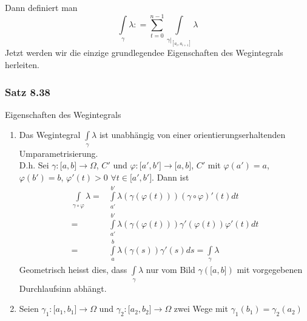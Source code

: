 \begin{enumerate}
Dann definiert man
\[\int\limits_\gamma  \lambda  : = \sum\limits_{t = 0}^{n - 1} {\int\limits_{{{\left. \gamma  \right|}_{\left[ {{a_i},{a_{i + 1}}} \right]}}} \lambda  } \]
Jetzt werden wir die einzige grundlegendee Eigenschaften des Wegintegrals herleiten.
\end{enumerate}

\subsubsection*{Satz 8.38}
Eigenschaften des Wegintegrals 
\begin{enumerate}[\indent E1)]
\item Das Wegintegral $\int\limits_\gamma  \lambda  $ ist unabhängig von einer orientierungserhaltenden Umparametrisierung. \\
D.h. Sei $\gamma :\lbrack a,b\rbrack\to\Omega$, $C'$ und $\varphi :\lbrack a',b'\rbrack\to\lbrack a,b\rbrack$, $C'$ mit $\varphi\left( a'\right)=a$, $\varphi\left( b'\right)=b$, $\varphi'\left( t\right) >0$ $\forall t\in\lbrack a', b'\rbrack$. Dann ist
\begin{align*}
\int\limits_{\gamma  \circ \varphi } \lambda   = &\int\limits_{a'}^{b'} {\lambda \left( {\gamma \left( {\varphi (t)} \right)} \right)\left( {\gamma  \circ \varphi } \right)'(t)dt} \\
 = &\int\limits_{a'}^{b'} {\lambda \left( {\gamma \left( {\varphi (t)} \right)} \right)\gamma '\left( {\varphi (t)} \right)\varphi '(t)dt} \\
 = &\int\limits_a^b {\lambda \left( {\gamma \left( s \right)} \right)\gamma '\left( s \right)ds = \int\limits_\gamma  \lambda  }
\end{align*}
Geometrisch heisst dies, dass $\int\limits_\gamma  \lambda$ nur vom Bild $\gamma\left( \lbrack a,b\rbrack\right)$ mit vorgegebenen Durchlaufsinn abhängt.
\item Seien $\gamma_1:\lbrack a_1,b_1\rbrack\to\Omega$ und $\gamma_2:\lbrack a_2,b_2\rbrack\to\Omega$ zwei Wege mit $\gamma_1\left( b_1\right)=\gamma_2\left(a_2\right)$
\begin{center}
\end{center}
\end{enumerate}
